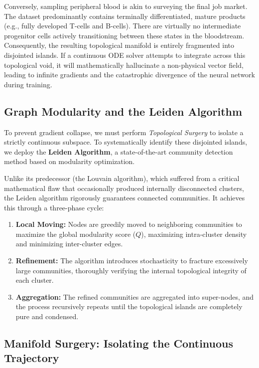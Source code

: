 \documentclass[12pt, a4paper]{article}
\begin{document}
	Conversely, sampling peripheral blood is akin to surveying the final job market. The dataset predominantly contains terminally differentiated, mature products (e.g., fully developed T-cells and B-cells). There are virtually no intermediate progenitor cells actively transitioning between these states in the bloodstream. Consequently, the resulting topological manifold is entirely fragmented into disjointed islands. If a continuous ODE solver attempts to integrate across this topological void, it will mathematically hallucinate a non-physical vector field, leading to infinite gradients and the catastrophic divergence of the neural network during training.
	
	\subsection{Graph Modularity and the Leiden Algorithm}
	
	To prevent gradient collapse, we must perform \textit{Topological Surgery} to isolate a strictly continuous subspace. To systematically identify these disjointed islands, we deploy the \textbf{Leiden Algorithm}, a state-of-the-art community detection method based on modularity optimization. 
	
	Unlike its predecessor (the Louvain algorithm), which suffered from a critical mathematical flaw that occasionally produced internally disconnected clusters, the Leiden algorithm rigorously guarantees connected communities. It achieves this through a three-phase cycle:
	\begin{enumerate}
		\item \textbf{Local Moving:} Nodes are greedily moved to neighboring communities to maximize the global modularity score ($Q$), maximizing intra-cluster density and minimizing inter-cluster edges.
		\item \textbf{Refinement:} The algorithm introduces stochasticity to fracture excessively large communities, thoroughly verifying the internal topological integrity of each cluster.
		\item \textbf{Aggregation:} The refined communities are aggregated into super-nodes, and the process recursively repeats until the topological islands are completely pure and condensed.
	\end{enumerate}
	
	\subsection{Manifold Surgery: Isolating the Continuous Trajectory}
	
\end{document}

